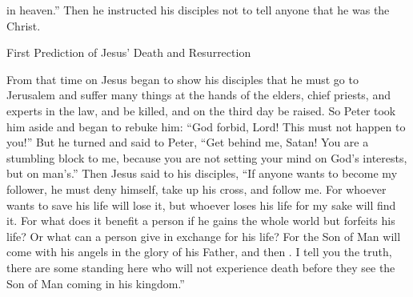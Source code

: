 {in
heaven.”
Then
he instructed
his disciples
not
to tell
anyone
that
he
was
the Christ.
\par }{\SH First Prediction of Jesus’ Death and Resurrection
\par }{\PP {}From
that time
on Jesus
began
to show
his
disciples
that
he must
go
to
Jerusalem
and
suffer
many things
at the hands of
the elders,
chief priests,
and
experts in the law,
and
be killed,
and
on the third
day
be raised.
So
Peter
took
him
aside
and began
to rebuke
him: “God forbid,
Lord! This
must
not
happen
to you!”
But
he turned
and said
to Peter,
“Get
behind
me,
Satan! You are
a stumbling block
to me,
because
you are
not
setting
your mind
on God’s interests,
but
on man’s.”
Then
Jesus
said
to his
disciples,
“If
anyone
wants
to become
my
follower,
he must deny
himself,
take up
his
cross,
and
follow
me.
For
whoever
wants
to save
his
life
will lose
it,
but
whoever
loses
his
life
for
my
sake
will find
it.
For
what
does it benefit
a person
if
he gains
the whole
world
but
forfeits
his
life? Or
what
can a person
give
in exchange
for his
life?
For
the Son
of Man
will
come
with
his
angels
in
the glory
of his
Father,
and
then
{}.
I tell
you
the truth,
there are
some
standing
here
who
will
not
experience
death
before
they see
the Son
of Man
coming
in
his
kingdom.”

}
